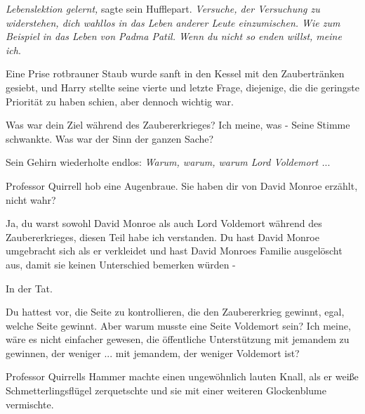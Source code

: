 \emph{Lebenslektion gelernt,} sagte sein Hufflepart. \emph{Versuche, der
Versuchung zu widerstehen, dich wahllos in das Leben anderer Leute einzumischen.
Wie zum Beispiel in das Leben von Padma Patil. Wenn du nicht so enden willst,
meine ich}.

Eine Prise rotbrauner Staub wurde sanft in den Kessel mit den Zaubertränken
gesiebt, und Harry stellte seine vierte und letzte Frage, diejenige, die die
geringste Priorität zu haben schien, aber dennoch wichtig war.

\glqq{}Was war dein Ziel während des Zaubererkrieges? Ich meine, was -\grqq{} Seine
Stimme schwankte. \glqq{}Was war der Sinn der ganzen Sache?\grqq{}

Sein Gehirn wiederholte endlos: \emph{Warum, warum, warum Lord Voldemort .}..

Professor Quirrell hob eine Augenbraue. \glqq{}Sie haben dir von David Monroe
erzählt, nicht wahr?\grqq{}

\glqq{}Ja, du warst sowohl David Monroe als auch Lord Voldemort während des
Zaubererkrieges, diesen Teil habe ich verstanden. Du hast David Monroe
umgebracht sich als er verkleidet und hast David Monroes Familie ausgelöscht
aus, damit sie keinen Unterschied bemerken würden -\grqq{}

\glqq{}In der Tat.\grqq{}

\glqq{}Du hattest vor, die Seite zu kontrollieren, die den Zaubererkrieg gewinnt,
egal, welche Seite gewinnt. Aber warum musste eine Seite Voldemort sein? Ich
meine, wäre es nicht einfacher gewesen, die öffentliche Unterstützung mit
jemandem zu gewinnen, der weniger ... mit jemandem, der weniger Voldemort
ist?\grqq{}

Professor Quirrells Hammer machte einen ungewöhnlich lauten Knall, als er weiße
Schmetterlingsflügel zerquetschte und sie mit einer weiteren Glockenblume
vermischte.

